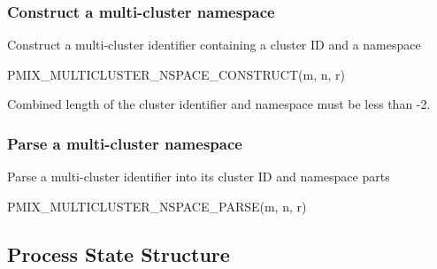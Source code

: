 \subsubsection{Construct a multi-cluster namespace}

Construct a multi-cluster identifier containing a cluster ID and a namespace

\cspecificstart
\begin{codepar}
PMIX_MULTICLUSTER_NSPACE_CONSTRUCT(m, n, r)
\end{codepar}
\cspecificend

\begin{arglist}
\end{arglist}

Combined length of the cluster identifier and namespace must be less than -2.

\subsubsection{Parse a multi-cluster namespace}

Parse a multi-cluster identifier into its cluster ID and namespace parts

\cspecificstart
\begin{codepar}
PMIX_MULTICLUSTER_NSPACE_PARSE(m, n, r)
\end{codepar}
\cspecificend

\begin{arglist}
\end{arglist}


\subsection{Process State Structure}
\label{api:struct:processstate}

